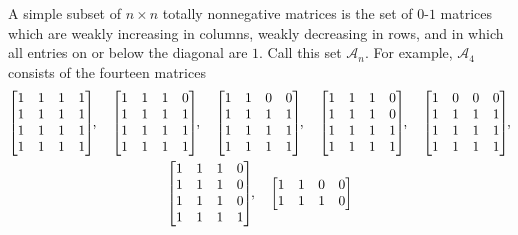 \documentclass[12pt]{amsart}
\theoremstyle{definition}
\numberwithin{equation}{section}
\newcommand{\A}{\mathcal{A}}
\newcommand{\ntksp}{\negthickspace}
\begin{document}
A simple subset of $n \times n$ totally nonnegative matrices is the set of
$0$-$1$
matrices which are weakly increasing in columns, weakly decreasing in rows,
and in which all entries on or below the diagonal are $1$.
Call this set $\A_n$.
For example, $\A_4$ consists of
the fourteen matrices
\begin{equation}\label{eq:14aamatrices}
  \begin{gathered}
  \begin{bmatrix}
    1 & 1 & 1 & 1\\
    1 & 1 & 1 & 1\\
    1 & 1 & 1 & 1\\
    1 & 1 & 1 & 1
  \end{bmatrix}\ntksp,
  \quad
  \begin{bmatrix}
    1 & 1 & 1 & 0\\
    1 & 1 & 1 & 1\\
    1 & 1 & 1 & 1\\
    1 & 1 & 1 & 1
  \end{bmatrix}\ntksp,
  \quad
  \begin{bmatrix}
    1 & 1 & 0 & 0\\
    1 & 1 & 1 & 1\\
    1 & 1 & 1 & 1\\
    1 & 1 & 1 & 1
  \end{bmatrix}\ntksp,
  \quad
  \begin{bmatrix}
    1 & 1 & 1 & 0\\
    1 & 1 & 1 & 0\\
    1 & 1 & 1 & 1\\
    1 & 1 & 1 & 1
  \end{bmatrix}\ntksp,
  \quad
  \begin{bmatrix}
    1 & 0 & 0 & 0\\
    1 & 1 & 1 & 1\\
    1 & 1 & 1 & 1\\
    1 & 1 & 1 & 1
  \end{bmatrix}\ntksp,
  \\
  \begin{bmatrix}
    1 & 1 & 1 & 0\\
    1 & 1 & 1 & 0\\
    1 & 1 & 1 & 0\\
    1 & 1 & 1 & 1
  \end{bmatrix}\ntksp,
  \quad
  \begin{bmatrix}
    1 & 1 & 0 & 0\\
    1 & 1 & 1 & 0\\

\end{bmatrix}
\end{gathered}
\end{equation}
\end{document}
